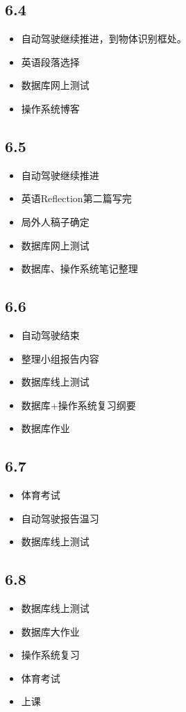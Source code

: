 \documentclass[UTF8]{ctexart}
\begin{document}
\subsection*{6.4}
\begin{itemize}
    \item 自动驾驶继续推进，到物体识别框处。
    \item 英语段落选择
    \item 数据库网上测试
    \item 操作系统博客
\end{itemize}
\subsection*{6.5}
\begin{itemize}
    \item 自动驾驶继续推进
    \item 英语Reflection第二篇写完
    \item 局外人稿子确定
    \item 数据库网上测试
    \item 数据库、操作系统笔记整理
\end{itemize}
\subsection*{6.6}
\begin{itemize}
    \item 自动驾驶结束
    \item 整理小组报告内容
    \item 数据库线上测试
    \item 数据库+操作系统复习纲要
    \item 数据库作业
\end{itemize}
\subsection*{6.7}
\begin{itemize}
    \item 体育考试
    \item 自动驾驶报告温习
    \item 数据库线上测试
\end{itemize}
\subsection*{6.8}
\begin{itemize}
    \item 数据库线上测试
    \item 数据库大作业
    \item 操作系统复习
    \item 体育考试
    \item 上课
\end{itemize}
\end{document}
